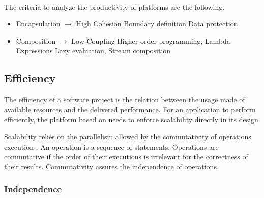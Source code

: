 



\paragraph{}

The criteria to analyze the productivity of platforms are the following.
\begin{itemize}
\item Encapsulation $\to$ High Cohesion
  \subitem Boundary definition
  \subitem Data protection
\item Composition $\to$ Low Coupling
  \subitem Higher-order programming, Lambda Expressions
  \subitem Lazy evaluation, Stream composition
\end{itemize}


\subsection{Efficiency} \label{chapter3:definitions:efficiency}

The efficiency of a software project is the relation between the usage made of available resources and the delivered performance.
For an application to perform efficiently, the platform based on needs to enforce scalability directly in its design.

Scalability relies on the parallelism allowed by the commutativity of operations execution \cite{Clements2013a}.
An operation is a sequence of statements.
Operations are commutative if the order of their executions is irrelevant for the correctness of their results.
Commutativity assures the independence of operations.

\subsubsection{Independence} \label{chapter3:definitions:efficiency:independence}

